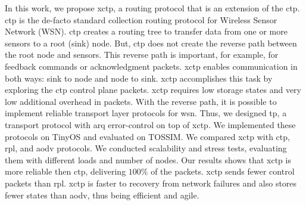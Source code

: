 In this work, we propose \ac{xctp}, a routing protocol that is an
extension of the \ac{ctp}. \ac{ctp} is the de-facto standard
collection routing protocol for Wireless Sensor Network (WSN).
\ac{ctp} creates a routing tree to transfer data from one or more
sensors to a root (sink) node. But, \ac{ctp} does not create the
reverse path between the root node and sensors. This reverse path is
important, for example, for feedback commands or acknowledgment
packets. \ac{xctp} enables communication in both ways: sink to node
and node to sink. \ac{xctp} accomplishes this task by exploring the
\ac{ctp} control plane packets. \ac{xctp} requires low storage
states and very low additional overhead in packets.  With the
reverse path, it is possible to implement reliable transport layer
protocols for \ac{wsn}. Thus, we designed \ac{tp}, a transport
protocol with \ac{arq} error-control on top of \ac{xctp}. We
implemented these protocols on TinyOS and evaluated on TOSSIM. We
compared \ac{xctp} with \ac{ctp}, \ac{rpl}, and \ac{aodv} protocols. We
conducted scalability and stress tests, evaluating them with
different loads and number of nodes. Our results shows that
\ac{xctp} is more reliable then \ac{ctp}, delivering $100\%$ of the
packets. \ac{xctp} sends fewer control packets than \ac{rpl}. \ac{xctp} is faster to recovery from network failures and also stores fewer states than \ac{aodv}, thus being efficient and agile.